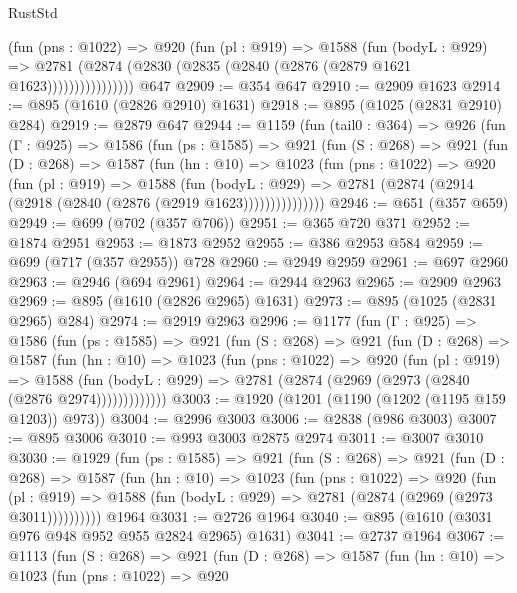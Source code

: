 \begin{lexlean}{RustStd}
\begin{coremodule}
{\begin{coremodule}
{{{{{{{{{                  (fun (pns : @1022) =>
                  @920
                    (fun (pl : @919) =>
                    @1588
                      (fun (bodyL : @929) =>
                      @2781 (@2874 (@2830 (@2835 (@2840 (@2876 (@2879 @1621 @1623))))))))))))))))
    @647
@2909 := @354 @647
@2910 := @2909 @1623
@2914 := @895 (@1610 (@2826 @2910) @1631)
@2918 := @895 (@1025 (@2831 @2910) @284)
@2919 := @2879 @647
@2944 := @1159
    (fun (tail0 : @364) =>
    @926
      (fun (Γ : @925) =>
      @1586
        (fun (ps : @1585) =>
        @921
          (fun (S : @268) =>
          @921
            (fun (D : @268) =>
            @1587
              (fun (hn : @10) =>
              @1023
                (fun (pns : @1022) =>
                @920
                  (fun (pl : @919) =>
                  @1588
                    (fun (bodyL : @929) =>
                    @2781 (@2874 (@2914 (@2918 (@2840 (@2876 (@2919 @1623)))))))))))))))
@2946 := @651 (@357 @659)
@2949 := @699 (@702 (@357 @706))
@2951 := @365 @720 @371
@2952 := @1874 @2951
@2953 := @1873 @2952
@2955 := @386 @2953 @584
@2959 := @699 (@717 (@357 @2955)) @728
@2960 := @2949 @2959
@2961 := @697 @2960
@2963 := @2946 (@694 @2961)
@2964 := @2944 @2963
@2965 := @2909 @2963
@2969 := @895 (@1610 (@2826 @2965) @1631)
@2973 := @895 (@1025 (@2831 @2965) @284)
@2974 := @2919 @2963
@2996 := @1177
    (fun (Γ : @925) =>
    @1586
      (fun (ps : @1585) =>
      @921
        (fun (S : @268) =>
        @921
          (fun (D : @268) =>
          @1587
            (fun (hn : @10) =>
            @1023
              (fun (pns : @1022) =>
              @920
                (fun (pl : @919) =>
                @1588
                  (fun (bodyL : @929) => @2781 (@2874 (@2969 (@2973 (@2840 (@2876 @2974)))))))))))))
@3003 := @1920 (@1201 (@1190 (@1202 (@1195 @159 @1203)) @973))
@3004 := @2996 @3003
@3006 := @2838 (@986 @3003)
@3007 := @895 @3006
@3010 := @993 @3003 @2875 @2974
@3011 := @3007 @3010
@3030 := @1929
    (fun (ps : @1585) =>
    @921
      (fun (S : @268) =>
      @921
        (fun (D : @268) =>
        @1587
          (fun (hn : @10) =>
          @1023
            (fun (pns : @1022) =>
            @920
              (fun (pl : @919) =>
              @1588 (fun (bodyL : @929) => @2781 (@2874 (@2969 (@2973 @3011))))))))))
    @1964
@3031 := @2726 @1964
@3040 := @895 (@1610 (@3031 @976 @948 @952 @955 @2824 @2965) @1631)
@3041 := @2737 @1964
@3067 := @1113
    (fun (S : @268) =>
    @921
      (fun (D : @268) =>
      @1587
        (fun (hn : @10) =>
        @1023
          (fun (pns : @1022) =>
          @920
}}}}}}}}}
\end{coremodule}}
\end{coremodule}
\end{lexlean}
